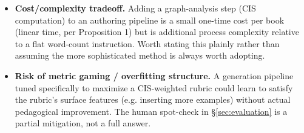\begin{itemize}
          only caught by validating on a second, differently-shaped chapter
          (\S\ref{sec:system}). The general point -- any recursive/PageRank-style
          importance measure with a floor and a heavy-tailed distribution needs
          value-based, not rank-based, discretization, and needs validation on
          more than one example before the discretization rule is trusted --
          likely generalizes beyond this paper's specific metric and may be
          worth stating as a standalone methodological caution for others
          applying similar graph-centrality metrics to content generation.
    \item \textbf{Cost/complexity tradeoff.} Adding a graph-analysis step
          (CIS computation) to an authoring pipeline is a small one-time cost per
          book (linear time, per Proposition 1) but is additional process
          complexity relative to a flat word-count instruction. Worth stating this
          plainly rather than assuming the more sophisticated method is always
          worth adopting.
    \item \textbf{Risk of metric gaming / overfitting structure.} A generation
          pipeline tuned specifically to maximize a CIS-weighted rubric could
          learn to satisfy the rubric's surface features (e.g. inserting more
          examples) without actual pedagogical improvement. The human spot-check
          in \S\ref{sec:evaluation} is a partial mitigation, not a full answer.
\end{itemize}
